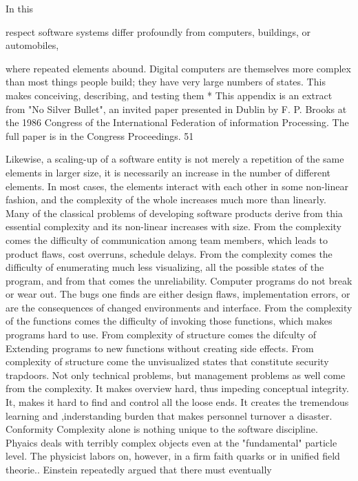 \documentclass[12pt]{article}
\begin{document}
In this

respect software systems differ profoundly from computers, buildings, or automobiles,

where repeated elements abound.
Digital computers are themselves more complex than most things people build; they
have very large numbers of states. This makes conceiving, describing, and testing them
* This appendix is an extract from "No Silver Bullet", an invited paper presented in
Dublin by F. P. Brooks at the 1986 Congress of the International Federation of information
Processing. The full paper is in the Congress Proceedings.
51

Likewise, a scaling-up of a software entity is not merely a repetition of the same
elements in larger size, it is necessarily an increase in the number of different elements.
In most cases, the elements interact with each other in some non-linear fashion, and the
complexity of the whole increases much more than linearly.
Many of the classical problems of developing software products derive from thia
essential complexity and its non-linear increases with size. From the complexity comes
the difficulty of communication among team members, which leads to product flaws, cost
overruns, schedule delays. From the complexity comes the difficulty of enumerating much
less visualizing, all the possible states of the program, and from that comes the unreliability.
Computer programs do not break or wear out. The bugs one finds are either design flaws,
implementation errors, or are the consequences of changed environments and interface.
From the complexity of the functions comes the difficulty of invoking those functions,
which makes programs hard to use. From complexity of structure comes the difculty of
Extending programs to new functions without creating side effects. From complexity of
structure come the unvisualized states that constitute security trapdoors.
Not only technical problems, but management problems as well come from the
complexity. It makes overview hard, thus impeding conceptual integrity. It, makes it hard
to find and control all the loose ends. It creates the tremendous learning and ,inderstanding
burden that makes personnel turnover a disaster.
Conformity
Complexity alone is nothing unique to the software discipline. Phyaics deals with
terribly complex objects even at the "fundamental" particle level. The physicist labors
on, however, in a firm faith %
quarks or in unified field theorie.. Einstein repeatedly argued that there must eventually
\end{document}
